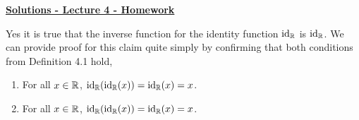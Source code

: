 \documentclass[12pt]{article} %
\begin{document}
	\renewcommand*{\coursecode}{MATH 235} %
	\renewcommand*{\assgnnumber}{Assignment 1} %
	\renewcommand*{\submdate}{September 14, 2021} %
	\renewcommand*{\studentfname}{Abdullah} %
	\renewcommand*{\studentlname}{Zubair} %
    \renewcommand*{\proofname}{Proof:}

	\renewcommand\qedsymbol{$\blacksquare$}
	\setfigpath
	\fancyhfoffset[L,O]{0pt} %




\begin{center}
	\textbf{\underline{\Huge{Solutions - Lecture 4 - Homework}}}
\end{center}

\begin{qstn}
  \begin{solution}
    Yes it is true that the inverse function for the identity function $\operatorname{id}_\mathbb R$ is $\operatorname{id}_\mathbb R$.
    We can provide proof for this claim quite simply by confirming that both conditions from Definition 4.1 hold,
    \begin{enumerate}
      \item For all $x \in \mathbb R$, $\operatorname{id}_\mathbb R(\operatorname{id}_\mathbb R(x)) = \operatorname{id}_\mathbb R(x) = x$.
      \item For all $x \in \mathbb R$, $\operatorname{id}_\mathbb R(\operatorname{id}_\mathbb R(x)) = \operatorname{id}_\mathbb R(x) = x$.
    \end{enumerate}
  \end{solution}
\end{qstn}
\end{document}
